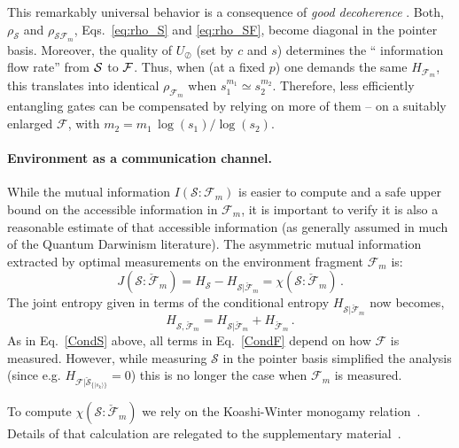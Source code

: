 \documentclass[aps,prl,showpacs,amsmath,amssymb,amsfonts,lengthcheck,twocolumn,longbibliography,superscriptaddress]{revtex4-2}
\newcommand{\ket}[1]    {| #1 \rangle}
\newcommand{\cS}        {{\mathcal S}}
\newcommand{\+}         {\dagger}
\newcommand\cF{{\mathcal F}}
\newcommand{\mc}[1]{\mathcal{#1}}
\begin{document}
This remarkably universal behavior is a consequence of \emph{good decoherence} \cite{ZQZ10}.  Both,  $\rho_{\mathcal{S}}$ and $\rho_{\mathcal{S}\mathcal{F}_m}$, Eqs.~\eqref{eq:rho_S} and \eqref{eq:rho_SF}, become diagonal in the pointer basis. Moreover, the quality of $U_{\oslash}$ (set by $c$ and $s$) determines the `` information flow rate'' from $\cal S$ to $\cal F$. Thus, when (at a fixed $p$) one demands the same $H_{\mc{F}_m}$, this translates into identical $\rho_{\cF_m}$  when $s_1^{m_1} \simeq s_2^{m_2}$. Therefore, less efficiently entangling gates can be compensated by relying on more of them -- on a suitably enlarged $\cF$, with $m_2 = m_1 \,\log(s_1)/\log(s_2)$. 

\paragraph{Environment as a communication channel.}
While the mutual information $I({\mc{S}}:\mc{F}_m)$ is easier to compute and a safe upper bound on the accessible information in $\cF_m$, it is important to verify it is also a reasonable estimate of that accessible information (as generally assumed in much of the Quantum Darwinism literature). 
The asymmetric mutual information extracted by optimal measurements on the environment fragment $\cF_m$ is:
\begin{equation}
 J(\cS : \check \cF_m) =  H_\cS - H_{\cS|\check{\cF}_m} = \chi(\cS : \check \cF_m)\,.
 \label{JF}
\end{equation}
The joint entropy given in terms of the conditional entropy $H_{\cS | {\check \cF}_m}$ now becomes,
\begin{equation}
H_{\cS, \check \cF_m} = H_{\cS | {\check \cF}_m} + H_{{\check \cF}_m}\, .
\label{CondF}
\end{equation}
As in Eq.~\eqref{CondS} above, all terms in  Eq.~\eqref{CondF} depend on how $\cF$ is measured. However, while measuring $\mc{S}$ in the pointer basis simplified the analysis (since e.g. $H_{{\cF}|{\check \cS}_{\{ \ket {s_k}\}}}=0$) this is no longer the case when $\cF_m$ is measured. 

To compute $\chi(\cS : \check \cF_m)$ we rely on the Koashi-Winter monogamy relation~\cite{KW}. Details of that calculation are relegated to the supplementary material~\cite{SM}.
\end{document}
